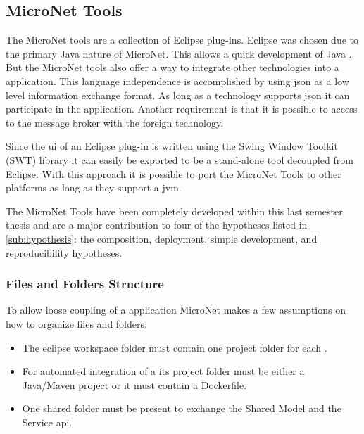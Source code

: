 \subsection{MicroNet Tools}
\label{sub:tools}

The MicroNet tools are a collection of Eclipse plug-ins. Eclipse was chosen due
to the primary Java nature of MicroNet. This allows a quick development of Java
\mss{}. But the MicroNet tools also offer a way to integrate other
technologies into a \ms{} application. This language independence is
accomplished by using \gls{json} as a low level information exchange format. As
long as a technology supports \gls{json} it can participate in the application.
Another requirement is that it is possible to access to the message broker with
the foreign technology.

Since the \gls{ui} of an Eclipse plug-in is written using the Swing
Window Toolkit (SWT) library it can easily be exported to be a stand-alone tool
decoupled from Eclipse. With this approach it is possible to port the MicroNet
Tools to other platforms as long as they support a \gls{jvm}.

The MicroNet Tools have been completely developed within this last semester
thesis and are a major contribution to four of the hypotheses listed in
\autoref{sub:hypothesis}: the composition, deployment, simple development, and 
reproducibility hypotheses.

\subsubsection{Files and Folders Structure}

To allow loose coupling of a \ms{} application MicroNet makes a few assumptions
on how to organize files and folders:

\begin{itemize}
  \item The eclipse workspace folder must contain one project folder for each
  \ms{}.
  \item For automated integration of a \ms{} its project folder must be either a
  Java/Maven project or it must contain a Dockerfile.
 \item One shared folder must be present to exchange the Shared Model and the
  Service \gls{api}.
\end{itemize}  

